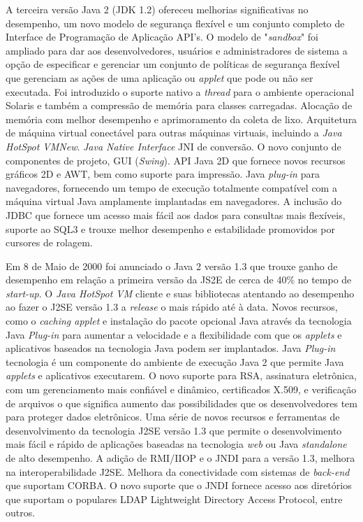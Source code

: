 A terceira vers\~{a}o Java 2 (\acs{JDK} 1.2) ofereceu melhorias significativas no desempenho, um novo modelo de segurança flex\'{i}vel e um conjunto completo de Interface de Programaç\~{a}o de Aplicaç\~{a}o \acs{API}'s. O modelo de "\textit{sandbox}" foi ampliado para dar aos desenvolvedores, usu\'{a}rios e administradores de sistema a opç\~{a}o de especificar e gerenciar um conjunto de pol\'{i}ticas de segurança flex\'{i}vel que gerenciam as aç\~{o}es de uma aplicaç\~{a}o ou \textit{applet} que pode ou n\~{a}o ser executada. Foi introduzido o suporte nativo a \textit{thread} para o ambiente operacional Solaris e tamb\'{e}m a compress\~{a}o de mem\'{o}ria para classes carregadas. Alocaç\~{a}o de mem\'{o}ria com melhor desempenho e aprimoramento da coleta de lixo. Arquitetura de m\'{a}quina virtual conect\'{a}vel para outras m\'{a}quinas virtuais, incluindo a \textit{Java HotSpot VMNew}. \textit{Java Native Interface }\acs{JNI} de convers\~{a}o. O novo conjunto de componentes de projeto, \acs{GUI} (\textit{Swing}). \acs{API} Java 2D que fornece novos recursos gr\'{a}ficos 2D e \acs{AWT}, bem como suporte para impress\~{a}o. Java \textit{plug-in} para navegadores, fornecendo um tempo de execuç\~{a}o totalmente compat\'{i}vel com a m\'{a}quina virtual Java amplamente implantadas em navegadores. A inclus\~{a}o do \acs{JDBC} que fornece um acesso mais f\'{a}cil aos dados para consultas mais flex\'{i}veis, suporte ao SQL3 e trouxe melhor desempenho e estabilidade promovidos por cursores de rolagem.


Em 8 de Maio de 2000 foi anunciado o Java 2 vers\~{a}o 1.3 que trouxe ganho de desempenho em relaç\~{a}o a primeira vers\~{a}o da JS2E de cerca de 40\%  no tempo de {\it  start-up}. O {\it Java HotSpot VM} cliente e suas bibliotecas atentando ao desempenho ao fazer o J2SE vers\~{a}o 1.3 a {\it release} o mais r\'{a}pido at\'{e} à data. Novos recursos, como o {\it caching applet} e instalaç\~{a}o do pacote opcional Java atrav\'{e}s da tecnologia Java {\it  Plug-in} para aumentar a velocidade e a flexibilidade com que os {\it applets} e aplicativos baseados na tecnologia Java podem ser implantados. Java {\it  Plug-in} tecnologia \'{e} um componente do ambiente de execuç\~{a}o Java 2 que permite Java {\it applets} e aplicativos executarem. O novo suporte para \acs{RSA}, assinatura eletrônica, com um gerenciamento mais confi\'{a}vel e din\^{a}mico, certificados X.509, e verificaç\~{a}o de arquivos o que significa aumento das possibilidades que os desenvolvedores tem para proteger dados eletrônicos. Uma s\'{e}rie de novos recursos e ferramentas de desenvolvimento da tecnologia J2SE vers\~{a}o 1.3 que permite o desenvolvimento mais f\'{a}cil e r\'{a}pido de aplicaç\~{o}es baseadas na tecnologia {\it web} ou Java {\it  standalone} de alto desempenho. A adiç\~{a}o de RMI/IIOP e o JNDI para a vers\~{a}o 1.3, melhora na interoperabilidade J2SE. Melhora da conectividade com sistemas de {\it  back-end} que suportam CORBA. O novo suporte que o JNDI fornece acesso aos diret\'{o}rios que suportam o populares LDAP Lightweight Directory Access Protocol, entre outros.


